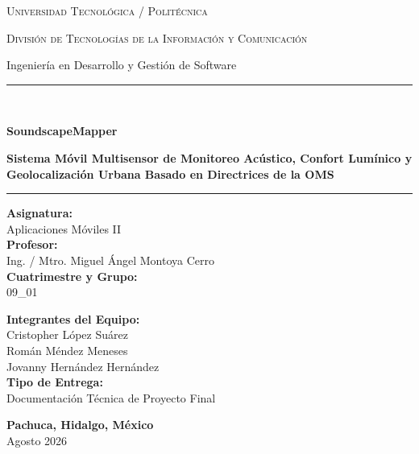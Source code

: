 \documentclass[12pt,a4paper]{article}
\begin{document}
\begin{titlepage}
    \centering
    \vspace*{0.5cm}
    
    {\scshape\LARGE Universidad Tecnológica / Politécnica \par}
    \vspace{0.3cm}
    {\scshape\large División de Tecnologías de la Información y Comunicación \par}
    {\large Ingeniería en Desarrollo y Gestión de Software \par}
    
    \vspace{1.5cm}
    \rule{\linewidth}{1.5pt} \\[0.4cm]
    {\huge \bfseries \color{TealDark} SoundscapeMapper \par}
    \vspace{0.3cm}
    {\Large \textbf{Sistema Móvil Multisensor de Monitoreo Acústico, Confort Lumínico y Geolocalización Urbana Basado en Directrices de la OMS} \par}
    \rule{\linewidth}{1.5pt}
    
    \vspace{1.5cm}
    
    \begin{minipage}[t]{0.48\textwidth}
        \textbf{Asignatura:}\\
        Aplicaciones Móviles II\\[0.4cm]
        \textbf{Profesor:}\\
        Ing. / Mtro. Miguel Ángel Montoya Cerro\\[0.4cm]
        \textbf{Cuatrimestre y Grupo:}\\
        09\_01
    \end{minipage}
    \hfill
    \begin{minipage}[t]{0.48\textwidth}
        \begin{flushright}
            \textbf{Integrantes del Equipo:}\\
            Cristopher López Suárez\\
            Román Méndez Meneses\\
            Jovanny Hernández Hernández\\[0.4cm]
            \textbf{Tipo de Entrega:}\\
            Documentación Técnica de Proyecto Final
        \end{flushright}
    \end{minipage}
    
    \vfill
    {\large \textbf{Pachuca, Hidalgo, México}}\\[0.2cm]
    {\large Agosto 2026}
\end{titlepage}
\end{document}
